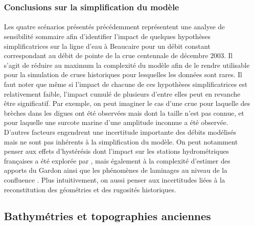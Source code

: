 \documentclass[11pt]{article}
\begin{document}
	\subsubsection{Conclusions sur la simplification du modèle}
	
	\paragraph{} Les quatre scénarios présentés précédemment représentent une analyse de sensibilité sommaire afin d'identifier l'impact de quelques hypothèses simplificatrices sur la ligne d'eau à Beaucaire pour un débit constant correspondant au débit de pointe de la crue centennale de décembre 2003. Il s'agit de réduire au maximum la complexité du modèle afin de le rendre utilisable pour la simulation de crues historiques pour lesquelles les données sont rares. Il faut noter que même si l'impact de chacune de ces hypothèses simplificatrices est relativement faible, l'impact cumulé de plusieurs d'entre elles peut en revanche être significatif. Par exemple, on peut imaginer le cas d'une crue pour laquelle des brèches dans les digues ont été observées mais dont la taille n'est pas connue, et pour laquelle une surcote marine d'une amplitude inconnue a été observée. D'autres facteurs engendrent une incertitude importante des débits modélisés mais ne sont pas inhérents à la simplification du modèle. On peut notamment penser aux effets d'hystérésis dont l'impact sur les stations hydrométriques françaises a été explorée par \cite{perret_framework_2022}, mais également à la complexité d'estimer des apports du Gardon ainsi que les phénomènes de laminages au niveau de la confluence \citep{symadrem_programme_2012}. Plus intuitivement, on aussi penser aux incertitudes liées à la reconstitution des géométries et des rugosités historiques.
	
	\subsection{Bathymétries et topographies anciennes}
	
\end{document}
